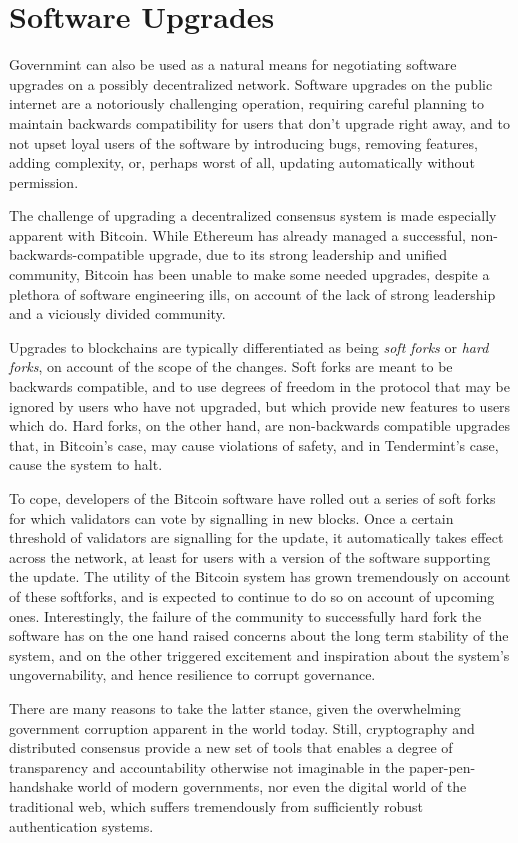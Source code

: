 \section{Software Upgrades}

Governmint can also be used as a natural means for negotiating software upgrades on a possibly decentralized network.
Software upgrades on the public internet are a notoriously challenging operation,
requiring careful planning to maintain backwards compatibility for users that don't upgrade right away,
and to not upset loyal users of the software by introducing bugs, removing features, adding complexity, or,
perhaps worst of all, updating automatically without permission.

The challenge of upgrading a decentralized consensus system is made especially apparent with Bitcoin.
While Ethereum has already managed a successful, non-backwards-compatible upgrade, 
due to its strong leadership and unified community,
Bitcoin has been unable to make some needed upgrades,
despite a plethora of software engineering ills,
on account of the lack of strong leadership and a viciously divided community.

Upgrades to blockchains are typically differentiated as being \emph{soft forks} or \emph{hard forks},
on account of the scope of the changes.
Soft forks are meant to be backwards compatible, and to use degrees of freedom in the protocol that may be ignored
by users who have not upgraded, but which provide new features to users which do.
Hard forks, on the other hand, are non-backwards compatible upgrades that,
in Bitcoin's case, may cause violations of safety, 
and in Tendermint's case, cause the system to halt.

To cope, developers of the Bitcoin software have rolled out a series of soft forks for which validators can vote by signalling in new blocks. 
Once a certain threshold of validators are signalling for the update,
it automatically takes effect across the network, at least for users with a version of the software supporting the update.
The utility of the Bitcoin system has grown tremendously on account of these softforks, 
and is expected to continue to do so on account of upcoming ones.
Interestingly, the failure of the community to successfully hard fork the software has
on the one hand raised concerns about the long term stability of the system,
and on the other triggered excitement and inspiration about the system's ungovernability,
and hence resilience to corrupt governance.

There are many reasons to take the latter stance, 
given the overwhelming government corruption apparent in the world today.
Still, cryptography and distributed consensus provide a new set of tools that enables a degree
of transparency and accountability otherwise not imaginable in the paper-pen-handshake world of modern governments,
nor even the digital world of the traditional web, which suffers tremendously from sufficiently robust authentication systems.

